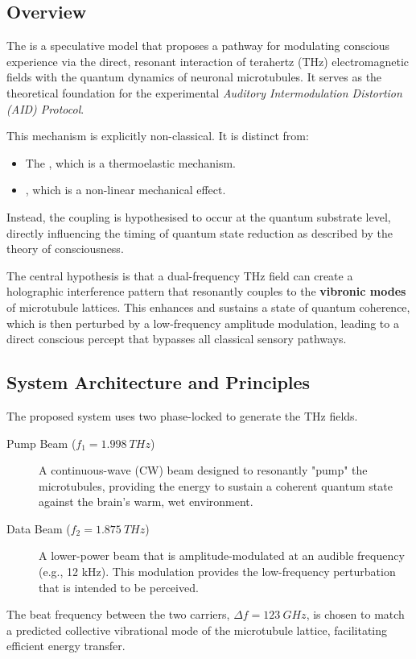 \subsection{Overview}

The  is a speculative model that proposes a pathway for modulating conscious experience via the direct, resonant interaction of terahertz (THz) electromagnetic fields with the quantum dynamics of neuronal microtubules. It serves as the theoretical foundation for the experimental \textit{Auditory Intermodulation Distortion (AID) Protocol}.

This mechanism is explicitly non-classical. It is distinct from:
\begin{itemize}
    \item The , which is a thermoelastic mechanism.
    \item {}, which is a non-linear mechanical effect.
\end{itemize}
Instead, the coupling is hypothesised to occur at the quantum substrate level, directly influencing the timing of quantum state reduction as described by the  theory of consciousness.

\begin{keyconcept}
    The central hypothesis is that a dual-frequency THz field can create a holographic interference pattern that resonantly couples to the \textbf{vibronic modes} of microtubule lattices. This enhances and sustains a state of quantum coherence, which is then perturbed by a low-frequency amplitude modulation, leading to a direct conscious percept that bypasses all classical sensory pathways.
\end{keyconcept}


\subsection{System Architecture and Principles}

The proposed system uses two phase-locked  to generate the THz fields.
\begin{description}
    \item[Pump Beam ($f_1 = \qty{1.998}{THz}$)] A continuous-wave (CW) beam designed to resonantly "pump" the microtubules, providing the energy to sustain a coherent quantum state against the brain's warm, wet environment.
    \item[Data Beam ($f_2 = \qty{1.875}{THz}$)] A lower-power beam that is amplitude-modulated at an audible frequency (e.g., 12 kHz). This modulation provides the low-frequency perturbation that is intended to be perceived.
\end{description}
The beat frequency between the two carriers, $\Delta f = \qty{123}{GHz}$, is chosen to match a predicted collective vibrational mode of the microtubule lattice, facilitating efficient energy transfer.


